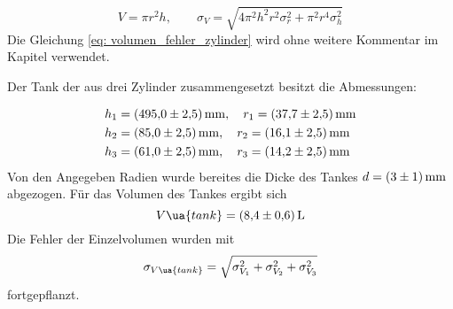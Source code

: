 \begin{equation}
  \label{eq: volumen_fehler_zylinder}
  V=\pi r^2 h, \qquad \sigma_{V}=\sqrt{4 \pi^{2} h^{2} r^{2} \sigma_{r}^{2}  + \pi^{2} r^{4} \sigma_{h}^{2} }
\end{equation}
Die Gleichung \ref{eq: volumen_fehler_zylinder} wird ohne weitere Kommentar im Kapitel verwendet.

Der Tank der aus drei Zylinder zusammengesetzt besitzt die Abmessungen:

\begin{align*}
h_1&=\SI{495 \pm 2.5}{\milli\meter}, \quad r_1=\SI{37.7\pm2.5}{\milli\meter} \\
h_2&=\SI{85 \pm 2.5}{\milli\meter}, \quad r_2=\SI{16.1\pm 2.5}{\milli\meter} \\
h_3&=\SI{61 \pm 2.5}{\milli\meter}, \quad r_3=\SI{14.2\pm 2.5}{\milli\meter} \\
\end{align*}
Von den Angegeben Radien wurde bereites die Dicke des Tankes $d=\SI{3\pm1}{\milli\meter}$ abgezogen.
Für das Volumen des Tankes ergibt sich
\begin{equation}
  \label{eq:volumen Tank}
  V\ua{tank}=\SI{8.4\pm0.6}{\litre}
\end{equation}
Die Fehler der Einzelvolumen wurden mit
\begin{equation}
  \label{eq:fehler_addi}
  \sigma_{V\ua{tank}}=\sqrt{\sigma_{V_{1}}^{2} + \sigma_{V_{2}}^{2}+\sigma_{V_{3}}^{2}}
\end{equation}
fortgepflanzt.


